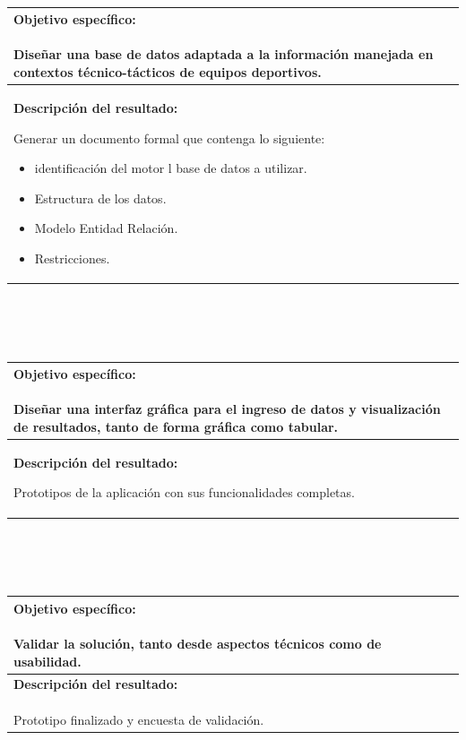 \documentclass[12pt]{article}
\begin{document}
			 \\ \\  \\ 
			\begin{tabular}{ |p{15cm}|} \hline
				 \parbox[c]{15cm}{ {\bf Objetivo específico:}\\ \\ Diseñar una base de datos adaptada a la información manejada en contextos técnico-tácticos de equipos deportivos.\\} 
			\\
			 \hline
				 \parbox[c]{15cm}{ {\bf Descripción del resultado:}\\ 
				 
Generar un documento formal que contenga lo siguiente:			 \\ 
\begin{itemize}
	\item identificación del motor l base de datos a utilizar.
	\item Estructura de los datos.
	\item Modelo Entidad Relación.
	\item Restricciones.
\end{itemize}	
				  } 
			 \\ \hline			 
			 \end{tabular}	
			 \\ \\  \\ 
			\begin{tabular}{ |p{15cm}|} \hline
				 \parbox[c]{15cm}{ {\bf Objetivo específico:}\\ \\Diseñar una interfaz gráfica para el ingreso de datos y visualización de resultados, tanto de forma gráfica como tabular. \\} 
			\\
			 \hline
				 \parbox[c]{15cm}{ {\bf Descripción del resultado:}\\
				 
				  Prototipos de la aplicación con sus funcionalidades completas.} 
			 \\ \hline			 
			 \end{tabular}	
			 \\ \\  \\ 
			\begin{tabular}{ |p{15cm}|} \hline
				 \parbox[c]{15cm}{ {\bf Objetivo específico:}\\ \\Validar la solución, tanto desde aspectos técnicos como de usabilidad. \\} 
			\\
			 \hline
				 \parbox[c]{15cm}{ {\bf Descripción del resultado:}\\ \\
					Prototipo finalizado y encuesta de validación.				 
				  \\} 
			 \\ \hline			 
			 \end{tabular}	
	\newpage

			
			
\end{document}
